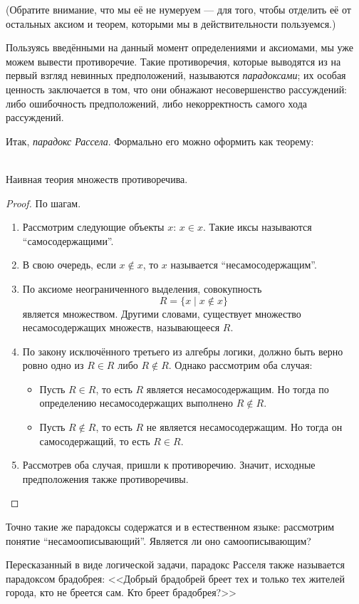 (Обратите внимание, что мы её не нумеруем --- для того, чтобы отделить её
от остальных аксиом и теорем, которыми мы в действительности пользуемся.)

Пользуясь введёнными на данный момент определениями и аксиомами, мы уже можем
вывести противоречие. Такие противоречия, которые выводятся из на первый взгляд
невинных предположений, называются \textit{парадоксами}; их особая ценность
заключается в том, что они обнажают несовершенство рассуждений: либо ошибочность
предположений, либо некорректность самого хода рассуждений.

Итак, \textit{парадокс Рассела}. Формально его можно оформить как теорему:

\begin{thm}
  \quad\\Наивная теория множеств противоречива.
\end{thm}
\begin{proof}По шагам.
\begin{enumerate}
  \item Рассмотрим следующие объекты $x$: $x\in x$. Такие иксы называются
    ``самосодержащими''.
  \item В свою очередь, если $x\not\in x$, то $x$ называется
    ``несамосодержащим''.
  \item По аксиоме неограниченного выделения, совокупность
    \[R = \{x\;|\;x\not\in x\}\] является множеством. Другими словами,
    существует множество несамосодержащих множеств, называющееся $R$.
  \item По закону исключённого третьего из алгебры логики, должно быть верно
    ровно одно из $R\in R$ либо $R\not\in R$. Однако рассмотрим оба случая:
    \begin{itemize}
      \item Пусть $R\in R$, то есть $R$ является несамосодержащим. Но тогда по
        определению несамосодержащих выполнено $R\not\in R$.
      \item Пусть $R\not\in R$, то есть $R$ не является несамосодержащим. Но
        тогда он самосодержащий, то есть $R\in R$.
    \end{itemize}
  \item Рассмотрев оба случая, пришли к противоречию. Значит, исходные
    предположения также противоречивы.
\end{enumerate}
\end{proof}
\begin{rem*}
  Точно такие же парадоксы содержатся и в естественном языке: рассмотрим понятие
  ``несамоописывающий''. Является ли оно самоописывающим?
\end{rem*}
\begin{rem*}
  Пересказанный в виде логической задачи, парадокс Расселя также называется
  парадоксом брадобрея: <<Добрый брадобрей бреет тех и только тех жителей
  города, кто не бреется сам. Кто бреет брадобрея?>>
\end{rem*}

